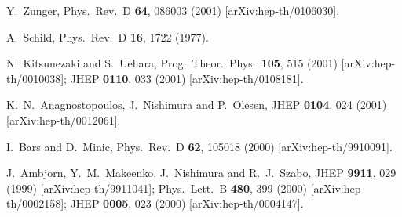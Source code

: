 \documentclass[a4paper,12pt]{article}
\begin{document}
\begin{thebibliography}{99}
	Y.~Zunger,
	Phys.\ Rev.\ D {\bf 64}, 086003 (2001)
	[arXiv:hep-th/0106030].

	A.~Schild,
	Phys.\ Rev.\ D {\bf 16}, 1722 (1977).

	N.~Kitsunezaki and S.~Uehara,
	Prog.\ Theor.\ Phys.\  {\bf 105}, 515 (2001)
	[arXiv:hep-th/0010038];
	JHEP {\bf 0110}, 033 (2001)
	[arXiv:hep-th/0108181].

	K.~N.~Anagnostopoulos, J.~Nishimura and P.~Olesen,
	JHEP {\bf 0104}, 024 (2001)
	[arXiv:hep-th/0012061].

	I.~Bars and D.~Minic,
	Phys.\ Rev.\ D {\bf 62}, 105018 (2000)
	[arXiv:hep-th/9910091].

	J.~Ambjorn, Y.~M.~Makeenko, J.~Nishimura and R.~J.~Szabo,
	JHEP {\bf 9911}, 029 (1999)
	[arXiv:hep-th/9911041];
	Phys.\ Lett.\ B {\bf 480}, 399 (2000)
	[arXiv:hep-th/0002158];
	JHEP {\bf 0005}, 023 (2000)
	[arXiv:hep-th/0004147].
\end{thebibliography}
\end{document}
